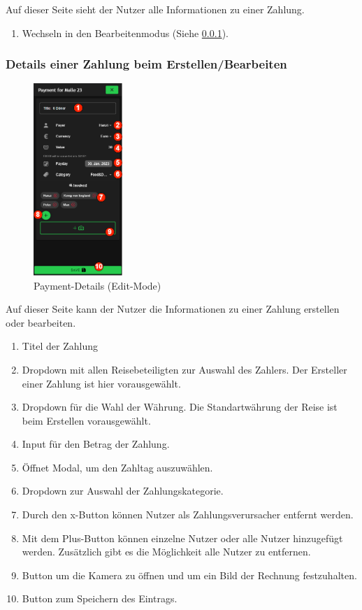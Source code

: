 Auf dieser Seite sieht der Nutzer alle Informationen zu einer Zahlung.

\begin{enumerate}[label=\protect\circled{\arabic*}]
	\item Wechseln in den Bearbeitenmodus (Siehe \ref{payment-details_(edit-mode)}).
\end{enumerate}

\subsubsection{Details einer Zahlung beim Erstellen/Bearbeiten}\label{payment-details_(edit-mode)}
\begin{figure}[H]
	\centering
	\includegraphics[width=0.3\textwidth]{img/pages_numbers/payment-details_(edit-mode).drawio}
	\caption[Payment-Details (Edit-Mode)]{Payment-Details (Edit-Mode)}
	\label{fig:payment-details_(edit-mode)}
\end{figure}

Auf dieser Seite kann der Nutzer die Informationen zu einer Zahlung erstellen oder bearbeiten.

\begin{enumerate}[label=\protect\circled{\arabic*}]
	\item Titel der Zahlung
	\item Dropdown mit allen Reisebeteiligten zur Auswahl des Zahlers. Der Ersteller einer Zahlung ist hier 			vorausgewählt.
	\item Dropdown für die Wahl der Währung. Die Standartwährung der Reise ist beim Erstellen vorausgewählt.
	\item Input für den Betrag der Zahlung.
	\item Öffnet Modal, um den Zahltag auszuwählen.
	\item Dropdown zur Auswahl der Zahlungskategorie.
	\item Durch den x-Button können Nutzer als Zahlungsverursacher entfernt werden.
	\item Mit dem Plus-Button können einzelne Nutzer oder alle Nutzer hinzugefügt werden. Zusätzlich gibt es die Möglichkeit alle Nutzer zu entfernen.
	\item Button um die Kamera zu öffnen und um ein Bild der Rechnung festzuhalten.
	\item Button zum Speichern des Eintrags.
\end{enumerate}


